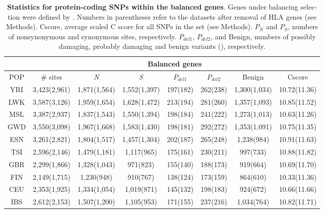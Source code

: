 \begin{refsection}
\begin{otherlanguage}{english}
\begin{table}
\centering
\small
\begin{tabular}{@{}cccccccc@{}}
\toprule
 & \multicolumn{7}{c}{Balanced genes} \\ \midrule
\rowcolor[HTML]{9B9B9B} 
{\color[HTML]{000000} POP} & {\color[HTML]{000000} \# sites} & {\color[HTML]{000000} \emph{N}} & {\color[HTML]{000000} \emph{S}} & {\color[HTML]{000000} $P_{del1}$} & {\color[HTML]{000000} $P_{del2}$} & {\color[HTML]{000000} Benign} & {\color[HTML]{000000} Cscore} \\ \cmidrule(r){1-8}
YRI & 3,423(2,961) & \multicolumn{1}{l}{1,871(1,564)} & \multicolumn{1}{l}{1,552(1,397)} & \multicolumn{1}{l}{197(182)} & \multicolumn{1}{l}{262(238)} & \multicolumn{1}{l}{1,300(1,034)} & \multicolumn{1}{l}{10.72(11.36)} \\
LWK & 3,587(3,126) & 1,959(1,654) & 1,628(1,472) & 213(194) & 281(260) & 1,357(1,093) & 10.85(11.52)  \\
MSL & 3,387(2,937) & 1,837(1,543) & 1,550(1,394) & 198(184) & 241(222) & 1,273(1,013) & 10.63(11.26)  \\
GWD & 3,550(3,098) & 1,967(1,668) & 1,583(1,430) & 198(181) & 292(272) & 1,353(1,091) & 10.75(11.35)  \\
ESN & 3,261(2,821) & 1,804(1,517) & 1,457(1,304) & 202(187) & 265(248) & 1,238(984) & 10.91(11.63) \\
TSI & 2,596(2,146) & 1,479(1,181) & 1,117(965) & 175(161) & 230(211) & 997(733) & 10.88(11.82)  \\
GBR & 2,299(1,866) & 1,328(1,043) & 971(823) & 155(140) & 188(173) & 919(664) & 10.69(11.70) \\
FIN & 2,149(1,715) & 1,230(948) & 910(767) & 138(124) & 173(159) & 864(610) & 10.33(11.36) \\
CEU & 2,353(1,925) & 1,334(1,054) & 1,019(871) & 145(132) & 198(183) & 924(672) & 10.66(11.66)  \\
IBS & 2,612(2,153) & 1,507(1,200) & 1,105(953) & 171(155) & 237(216) & 1,034(764) & 10.82(11.71)  \\ \bottomrule
\end{tabular}
\caption{\textbf{Statistics for protein-coding SNPs  within the balanced genes}. Genes under balancing selection were defined by \textcite{Bitarello2016}. Numbers in parentheses refer to the datasets after removal of HLA genes (see Methods). Cscore, average scaled C score for all SNPs in the set (see Methods). $P_{N}$ and $P_{S}$, numbers of nonsynonymous and synonymous sites, respectively. $P_{del1}$, $P_{del2}$, and Benign, numbers of possibly damaging, probably damaging and benign variants (\cite{Adzhubei2010}), respectively.
}
\label{tab:balancedSNPs}
\end{table}


\end{otherlanguage}
\end{refsection}
